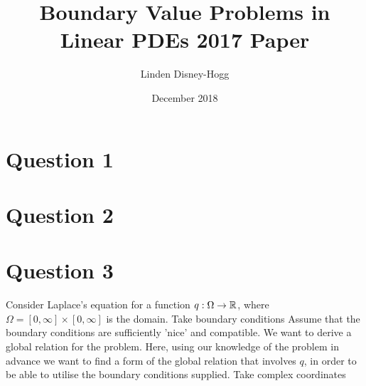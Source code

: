 \documentclass{article}
\title{Boundary Value Problems in Linear PDEs 2017 Paper}
\author{Linden Disney-Hogg}
\date{December 2018}
\begin{document}
\maketitle
\tableofcontents

\section{Question 1}

\section{Question 2}

\section{Question 3}

Consider Laplace's equation 
for a function $q:\Omega\to\mathbb{R}$, where $\Omega = [0,\infty]\times[0,\infty]$ is the domain. Take boundary conditions 
Assume that the boundary conditions are sufficiently 'nice' and compatible. We want to derive a global relation for the problem. Here, using our knowledge of the problem in advance we want to find a form of the global relation that involves $q$, in order to be able to utilise the boundary conditions supplied. Take complex coordinates 
\end{document}
